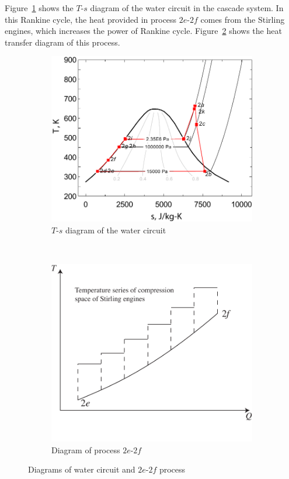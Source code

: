 Figure~\ref{fig:T-s_Water2} shows the $T$-$s$ diagram of the water circuit in the cascade system. In this Rankine cycle, the heat provided in process $2e$-$2f$ comes from the Stirling engines, which increases the power of Rankine cycle. Figure~\ref{fig:HeatTransfer_Water-SEs} shows the heat transfer diagram of this process.

\noindent \begin{figure}[htbp]
\centering
	\begin{subfigure}[b]{0.45\columnwidth}
	\includegraphics[width = \columnwidth]{fig/T-s_Water2}
	\caption{$T$-$s$ diagram of the water circuit}\label{fig:T-s_Water2}
	\end{subfigure}
	~
\begin{subfigure}[b]{0.45\columnwidth}
	\includegraphics[width = \columnwidth]{fig/HeatTransfer_Water-SEs}
	\caption{Diagram of process $2e$-$2f$}\label{fig:HeatTransfer_Water-SEs}
	\end{subfigure}
	
	\caption{Diagrams of water circuit and $2e$-$2f$ process}\label{fig:Diagrams$2e$-$2f$}
\end{figure}


